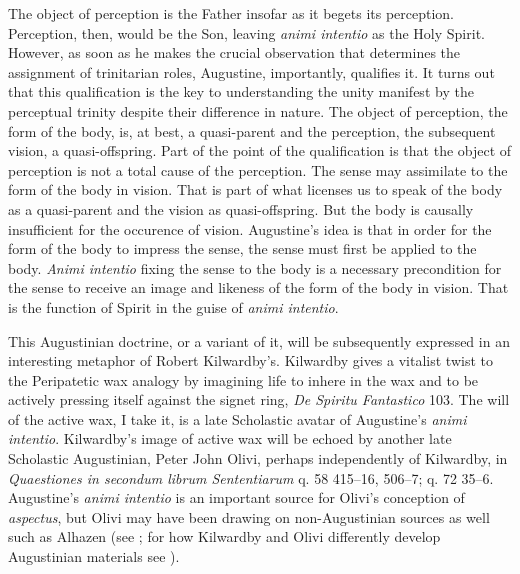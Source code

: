 \documentclass[12pt]{article}
\begin{document}
The object of perception is the Father insofar as it begets its perception. Perception, then, would be the Son, leaving \emph{animi intentio} as the Holy Spirit. However, as soon as he makes the crucial observation that determines the assignment of trinitarian roles, Augustine, importantly, qualifies it. It turns out that this qualification is the key to understanding the unity manifest by the perceptual trinity despite their difference in nature. The object of perception, the form of the body, is, at best, a quasi-parent and the perception, the subsequent vision, a quasi-offspring. Part of the point of the qualification is that the object of perception is not a total cause of the perception. The sense may assimilate to the form of the body in vision. That is part of what licenses us to speak of the body as a quasi-parent and the vision as quasi-offspring. But the body is causally insufficient for the occurence of vision. Augustine's idea is that in order for the form of the body to impress the sense, the sense must first be applied to the body. \emph{Animi intentio} fixing the sense to the body is a necessary precondition for the sense to receive an image and likeness of the form of the body in vision. That is the function of Spirit in the guise of \emph{animi intentio}. 

This Augustinian doctrine, or a variant of it, will be subsequently expressed in an interesting metaphor of Robert Kilwardby's. Kilwardby gives a vitalist twist to the Peripatetic wax analogy by imagining life to inhere in the wax and to be actively pressing itself against the signet ring, \emph{De Spiritu Fantastico} 103. The will of the active wax, I take it, is a late Scholastic avatar of Augustine's \emph{animi intentio}. Kilwardby's image of active wax will be echoed by another late Scholastic Augustinian, Peter John Olivi, perhaps independently of Kilwardby, in \emph{Quaestiones in secondum librum Sententiarum} q. 58 415–16, 506–7; q. 72 35–6. Augustine's \emph{animi intentio} is an important source for Olivi's conception of \emph{aspectus}, but Olivi may have been drawing on non-Augustinian sources as well such as Alhazen (see \citealt[41 especially n. 43]{Tachau:1988aa}; for how Kilwardby and Olivi differently develop Augustinian materials see \citealt{Silva:2010zh}). 
\end{document}
